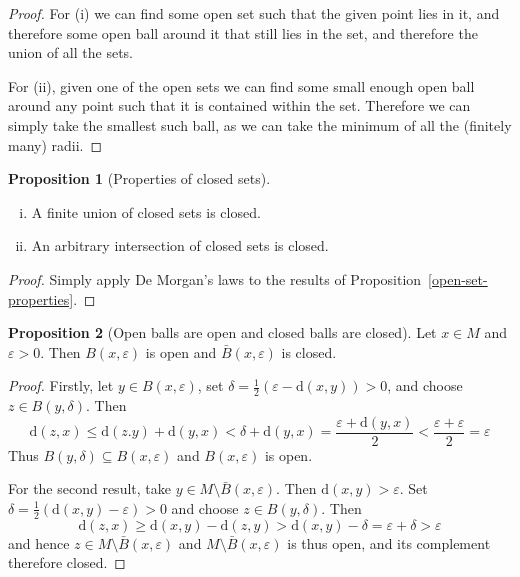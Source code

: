 \documentclass[10pt,fleqn]{article}
\newcommand{\met}{\mathrm{d}}
\newcommand{\eps}{\varepsilon}
\theoremstyle{definition} \newtheorem{defn}{Definition}[section]
\theoremstyle{plain}      \newtheorem{thm}[defn]{Theorem}
\theoremstyle{definition} \newtheorem{prop}[defn]{Proposition}
\theoremstyle{definition} \newtheorem{cor}[defn]{Corollary}
\theoremstyle{definition} \newtheorem{ex}[defn]{Example}
\theoremstyle{definition} \newtheorem{rem}[defn]{Remark}
\begin{document}
\begin{proof}
    For (i) we can find some open set such that the given point lies in it, and therefore some open ball around it that still lies in the set, and therefore the union of all the sets.

    For (ii), given one of the open sets we can find some small enough open ball around any point such that it is contained within the set.
    Therefore we can simply take the smallest such ball, as we can take the minimum of all the (finitely many) radii.
\end{proof}

\begin{prop}[Properties of closed sets]
    \begin{enumerate}[(i)]
        \item A finite union of closed sets is closed.
        \item An arbitrary intersection of closed sets is closed.
    \end{enumerate}
\end{prop}

\begin{proof}
    Simply apply De Morgan's laws to the results of Proposition~\ref{open-set-properties}.
\end{proof}

\begin{prop}[Open balls are open and closed balls are closed]
    Let $x\in M$ and $\eps>0$.
    Then $B(x,\eps)$ is open and $\bar{B}(x,\eps)$ is closed.
\end{prop}

\begin{proof}
    Firstly, let $y\in B(x,\eps)$, set $\delta = \frac{1}{2}(\eps-\met(x,y))>0$, and choose $z\in B(y,\delta)$.
    Then
    \[
        \met(z,x)\leq
        \met(z.y)+\met(y,x)<
        \delta+\met(y,x)=
        \frac{\eps+\met(y,x)}{2}<
        \frac{\eps+\eps}{2}=
        \eps
    \]
    Thus $B(y,\delta)\subseteq B(x,\eps)$ and $B(x,\eps)$ is open.

    For the second result, take $y\in M\setminus\bar{B}(x,\eps)$.
    Then $\met(x,y)>\eps$.
    Set $\delta = \frac{1}{2}(\met(x,y)-\eps)>0$ and choose $z\in B(y,\delta)$.
    Then
    \[
        \met(z,x)\geq
        \met(x,y)-\met(z,y)>
        \met(x,y)-\delta=
        \eps+\delta>
        \eps
    \]
    and hence $z\in M\setminus\bar{B}(x,\eps)$ and $M\setminus\bar{B}(x,\eps)$ is thus open, and its complement therefore closed.
\end{proof}
\end{document}
